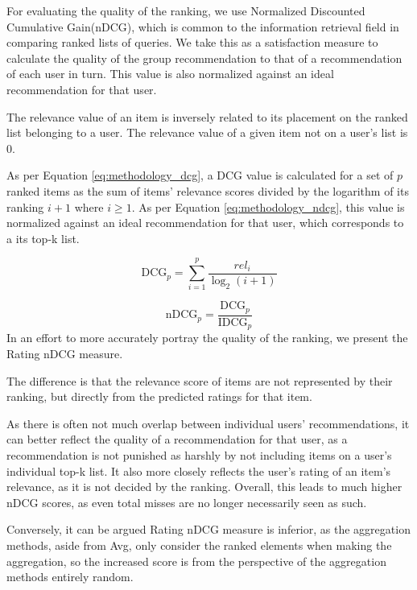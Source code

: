 \label{sec:methodology_ndcg}
For evaluating the quality of the ranking, we use Normalized Discounted Cumulative Gain(nDCG), which is common to the information retrieval field in comparing ranked lists of queries. We take this as a satisfaction measure to calculate the quality of the group recommendation to that of a recommendation of each user in turn. This value is also normalized against an ideal recommendation for that user.


The relevance value of an item is inversely related to its placement on the ranked list belonging to a user. The relevance value of a given item not on a user's list is 0.

As per Equation \ref{eq:methodology_dcg}, a DCG value is calculated for a set of $p$ ranked items as the sum of items' relevance scores divided by the logarithm of its ranking $i + 1$ where $i \geq 1$. As per Equation \ref{eq:methodology_ndcg}, this value is normalized against an ideal recommendation for that user, which corresponds to a its top-k list.

\begin{equation}\label{eq:methodology_dcg}
\text{DCG}_p = \sum_{i=1}^{p}\frac{\textit{rel}_i}{\log_2(i + 1)}
\end{equation}

\begin{equation}\label{eq:methodology_ndcg}
\text{nDCG}_p = \frac{\text{DCG}_p}{\text{IDCG}_p}
\end{equation}
In an effort to more accurately portray the quality of the ranking, we present the Rating nDCG measure.

The difference is that the relevance score of items are not represented by their ranking, but directly from the predicted ratings for that item.

As there is often not much overlap between individual users' recommendations, it can better reflect the quality of a recommendation for that user, as a recommendation is not punished as harshly by not including items on a user's individual top-k list. It also more closely reflects the user's rating of an item's relevance, as it is not decided by the ranking. Overall, this leads to much higher nDCG scores, as even total misses are no longer necessarily seen as such.

Conversely, it can be argued Rating nDCG measure is inferior, as the aggregation methods, aside from Avg, only consider the ranked elements when making the aggregation, so the increased score is from the perspective of the aggregation methods entirely random.